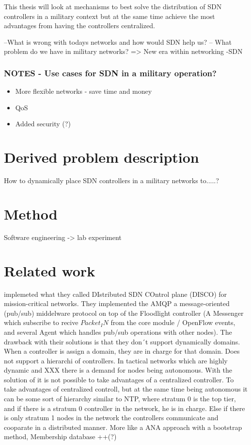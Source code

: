 This thesis will look at mechanisms to best solve the distribution of SDN controllers in a military context but at the same time achieve the most advantages from having the controllers centralized.

--What is wrong with todays networks and how would SDN help us?
-- What problem do we have in military networks? => New era within networking -SDN

\subsubsection{NOTES - Use cases for SDN in a military operation?}
\begin{itemize}
\item More flexible networks - save time and money
\item QoS
\item Added security (?)
\end{itemize}



\section{Derived problem description}
How to dynamically place SDN controllers in a military networks to.....?


\section{Method}
Software engineering -> lab experiment

\section{Related work}
\cite{DISCO} implemeted what they called DIstributed SDN COntrol plane (DISCO) for mission-critical networks. They implemented the AMQP a message-oriented (pub/sub) middelware protocol on top of the Floodlight controller (A Messenger which subscribe to recive $Packet_IN$ from the core module / OpenFlow events, and several Agent which handles pub/sub operations with other nodes). The drawback with their solutions is that they don´t support dynamically domains. When a controller is assign a domain, they are in charge for that domain. Does not support a hierarchi of controllers. In tactical networks which are highly dynamic and XXX there is a demand for nodes being autonomous. With the solution of \cite{DISCO} it is not possible to take advantages of a centralized controller. To take advantages of centralized controll, but at the same time being autonomous it can be some sort of hierarchy similar to NTP, where stratum 0 is the top tier, and if there is a stratum 0 controller in the network, he is in charge. Else if there is only stratum 1 nodes in the network the controllers communicate and cooparate in a distributed manner. More like a ANA approach with a bootstrap method, Membership database ++(?)\cite{ana}

